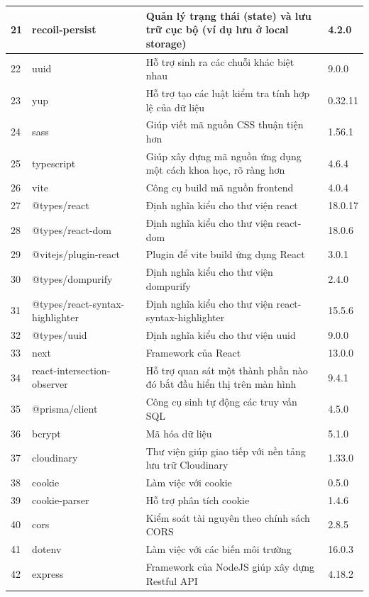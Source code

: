\documentclass[../DoAn.tex]{subfiles}
\begin{document}
\begin{longtable}{|p{}|p{}|p{}|p{}|}
21 & recoil-persist & Quản lý trạng thái (state) và lưu trữ cục bộ (ví dụ lưu ở local storage) & 4.2.0 \\ \hline
22 & uuid & Hỗ trợ sinh ra các chuỗi khác biệt nhau & 9.0.0 \\ \hline
23 & yup & Hỗ trợ tạo các luật kiểm tra tính hợp lệ của dữ liệu & 0.32.11 \\ \hline
24 & sass & Giúp viết mã nguồn CSS thuận tiện hơn & 1.56.1 \\ \hline
25 & typescript & Giúp xây dựng mã nguồn ứng dụng một cách khoa học, rõ ràng hơn & 4.6.4 \\ \hline
26 & vite & Công cụ build mã nguồn frontend & 4.0.4 \\ \hline
27 & @types/react & Định nghĩa kiểu cho thư viện react & 18.0.17 \\ \hline
28 & @types/react-dom & Định nghĩa kiểu cho thư viện react-dom & 18.0.6 \\ \hline
29 & @vitejs/plugin-react & Plugin để vite build ứng dụng React & 3.0.1 \\ \hline
30 & @types/dompurify & Định nghĩa kiểu cho thư viện dompurify & 2.4.0 \\ \hline
31 & @types/react-syntax-highlighter & Định nghĩa kiểu cho thư viện react-syntax-highlighter & 15.5.6 \\ \hline
32 & @types/uuid & Định nghĩa kiểu cho thư viện uuid & 9.0.0 \\ \hline
33 & next & Framework của React  & 13.0.0 \\ \hline
34 & react-intersection-observer & Hỗ trợ quan sát một thành phần nào đó bắt đầu hiển thị trên màn hình & 9.4.1 \\ \hline
35 & @prisma/client & Công cụ sinh tự động các truy vấn SQL & 4.5.0 \\ \hline
36 & bcrypt & Mã hóa dữ liệu & 5.1.0 \\ \hline
37 & cloudinary & Thư viện giúp giao tiếp với nền tảng lưu trữ Cloudinary & 1.33.0 \\ \hline
38 & cookie & Làm việc với cookie & 0.5.0 \\ \hline
39 & cookie-parser & Hỗ trợ phân tích cookie & 1.4.6 \\ \hline
40 & cors & Kiểm soát tài nguyên theo chính sách CORS & 2.8.5 \\ \hline
41 & dotenv & Làm việc với các biến môi trường & 16.0.3 \\ \hline
42 & express & Framework của NodeJS giúp xây dựng Restful API & 4.18.2 \\ \hline

\end{longtable}
\end{document}
